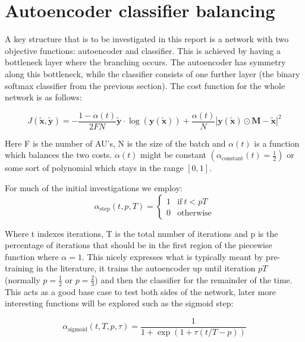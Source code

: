   \section{Autoencoder classifier balancing} \label{sec:autoalpha}
    A key structure that is to be investigated in this report is a network with two objective functions:
    autoencoder and classifier. This is achieved by having a bottleneck layer where the branching occurs.
    The autoencoder has symmetry along this bottleneck, while the classifier consists of one further layer
    (the binary softmax classifier from the previous section). The cost function for the whole network is as follows:

    \begin{equation}
        J(\tilde{\mathbf{x}},\tilde{\mathbf{y}}) = -\frac{1-\alpha(t)}{2FN}\tilde{\mathbf{y}}\cdot\log(\mathbf{y}(\tilde{\mathbf{x}}))
        + \frac{\alpha(t)}{N}\left |\mathbf{y}(\tilde{\mathbf{x}}) \odot \mathbf{M}-\tilde{\mathbf{x}}\right | ^2
    \end{equation}

    Here F is the number of AU's, N is the size of the batch and $\alpha(t)$ is a
    function which balances the two costs. $\alpha(t)$ might be constant $\left ( \alpha_{\text{constant}}(t)=\frac{1}{2} \right )$ or
    some sort of polynomial which stays in the range $[0,1]$.

    For much of the initial investigations we employ:
    \begin{equation}
    \alpha_{\text{step}}(t,p,T) =
    \begin{cases}
      1           & \text{if}\ t<pT \\
      0           & \text{otherwise}
    \end{cases}
    \end{equation}

    Where t indexes iterations, T is the total number of iterations and p is the
    percentage of iterations that should be in the first region of the piecewise function
    where $\alpha=1$.
    This nicely expresses what is typically meant by pre-training in the literature, it trains
    the autoencoder up until iteration $pT$ (normally $p=\frac{1}{2}$ or $p=\frac{2}{3}$) and then the classifier for the remainder of the time.
    This acts as a good base case to test both sides of the network, later more interesting
    functions will be explored such as the sigmoid step:

    \begin{equation}
      \alpha_{\text{sigmoid}}(t,T,p,\tau) = \frac{1}{1 + \exp(1 + \tau (t/T - p))}
    \end{equation}

